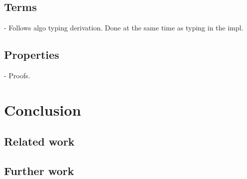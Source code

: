 \documentclass[twocolumn]{article}
\begin{document}
\subsection{Terms}
- Follows algo typing derivation. Done at the same time as typing in the
impl.

\subsection{Properties}
- Proofs.

\section{Conclusion}
\subsection{Related work}

\subsection{Further work}
\end{document}
